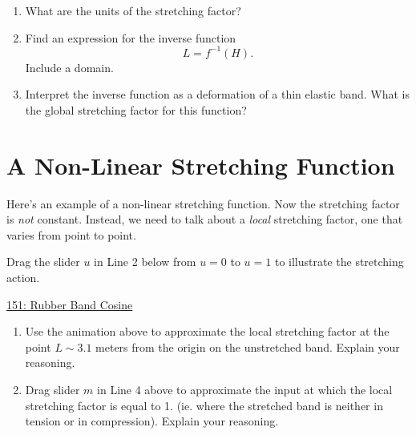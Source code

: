 \documentclass{ximera}
\begin{document}
\begin{question}  \label{Q:LDJJNMDesd}
\begin{enumerate}
\item What are the units of the stretching factor?
\begin{freeResponse}
\end{freeResponse}

\item Find an expression for the inverse function
\[
      L = f^{-1}(H).
\]
Include a domain. 

\item Interpret the inverse function as a deformation of a thin elastic band. What is the global stretching factor for this function?
\begin{freeResponse}
\end{freeResponse}
\end{enumerate}
\end{question}



\section{A Non-Linear Stretching Function}
Here's an example of a non-linear stretching function. Now the stretching factor is \emph{not} constant. Instead, we need to talk about a \emph{local} stretching factor, one that varies from point to point. 

\begin{exploration} \label{ExLdfdfthyhhhf}
Drag the slider $u$ in Line 2 below from $u=0$ to $u=1$ to illustrate the stretching action.
\begin{onlineOnly}
    \begin{center}
\end{center}
\end{onlineOnly}

\href{https://www.desmos.com/calculator/hqvyhormhf}{151: Rubber Band Cosine}

\end{exploration}

\begin{question} \label{Q:9887dfsdfdsf}
\begin{enumerate}
\item Use the animation above to approximate the local stretching factor at the point $L\sim 3.1$ meters from the origin on the unstretched band. Explain your reasoning.

\item Drag slider $m$ in Line 4 above to approximate the input at which the local stretching factor is equal to 1. (ie. where the stretched band is neither in tension or in compression). Explain your reasoning.
\end{enumerate}
\end{question}
\end{document}
